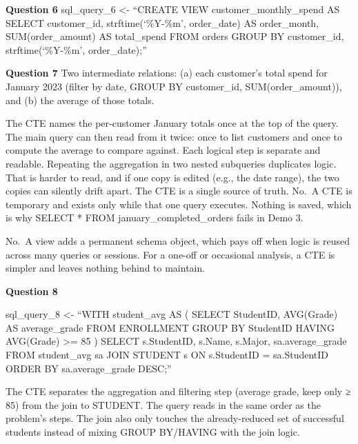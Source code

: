 \documentclass[
]{article}
\begin{document}
\textbf{Question 6} sql\_query\_6 \textless- ``CREATE VIEW
customer\_monthly\_spend AS SELECT customer\_id, strftime(`\%Y-\%m',
order\_date) AS order\_month, SUM(order\_amount) AS total\_spend FROM
orders GROUP BY customer\_id, strftime(`\%Y-\%m', order\_date);''

\textbf{Question 7} Two intermediate relations: (a) each customer's
total spend for January 2023 (filter by date, GROUP BY customer\_id,
SUM(order\_amount)), and (b) the average of those totals.

The CTE names the per-customer January totals once at the top of the
query. The main query can then read from it twice: once to list
customers and once to compute the average to compare against. Each
logical step is separate and readable. Repeating the aggregation in two
nested subqueries duplicates logic. That is harder to read, and if one
copy is edited (e.g., the date range), the two copies can silently drift
apart. The CTE is a single source of truth. No.~A CTE is temporary and
exists only while that one query executes. Nothing is saved, which is
why SELECT * FROM january\_completed\_orders fails in Demo 3.

No.~A view adds a permanent schema object, which pays off when logic is
reused across many queries or sessions. For a one-off or occasional
analysis, a CTE is simpler and leaves nothing behind to maintain.

\textbf{Question 8}

sql\_query\_8 \textless- ``WITH student\_avg AS ( SELECT StudentID,
AVG(Grade) AS average\_grade FROM ENROLLMENT GROUP BY StudentID HAVING
AVG(Grade) \textgreater= 85 ) SELECT s.StudentID, s.Name, s.Major,
sa.average\_grade FROM student\_avg sa JOIN STUDENT s ON s.StudentID =
sa.StudentID ORDER BY sa.average\_grade DESC;''

The CTE separates the aggregation and filtering step (average grade,
keep only ≥ 85) from the join to STUDENT. The query reads in the same
order as the problem's steps. The join also only touches the
already-reduced set of successful students instead of mixing GROUP
BY/HAVING with the join logic.
\end{document}
